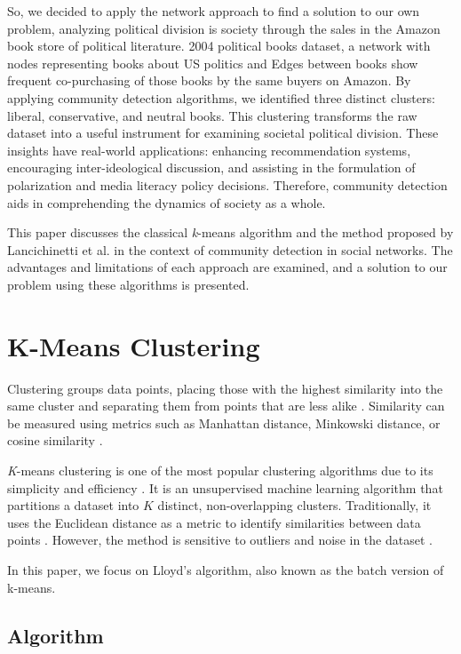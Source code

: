 \documentclass[conference]{IEEEtran}
\begin{document}
So, we decided to apply the network approach to find a solution to our own problem, analyzing political division is society through the sales in the Amazon book store of political literature. 2004 political books dataset\cite{newman_netdata}, a network with nodes representing books about US politics and Edges between books show frequent co-purchasing of those books by the same buyers on Amazon. By applying community detection algorithms, we identified three distinct clusters: liberal, conservative, and neutral books. This clustering transforms the raw dataset into a useful instrument for examining societal political division. These insights have real-world applications: enhancing recommendation systems, encouraging inter-ideological discussion, and assisting in the formulation of polarization and media literacy policy decisions. Therefore, community detection aids in comprehending the dynamics of society as a whole.

This paper discusses the classical \textit{k}-means algorithm and the method proposed by Lancichinetti et al. \cite{lancichinetti2009detecting} in the context of community detection in social networks. The advantages and limitations of each approach are examined, and a solution to our problem using these algorithms is presented.

\section{K-Means Clustering}

Clustering groups data points, placing those with the highest similarity into the same cluster and separating them from points that are less alike \cite{anderberg1973cluster}. Similarity can be measured using metrics such as Manhattan distance, Minkowski distance, or cosine similarity \cite{irani2016clustering}.

\textit{K}-means clustering is one of the most popular clustering algorithms due to its simplicity and efficiency \cite{slonim2013hartigan}. It is an unsupervised machine learning algorithm that partitions a dataset into $K$ distinct, non-overlapping clusters. Traditionally, it uses the Euclidean distance as a metric to identify similarities between data points \cite{irani2016clustering}. However, the method is sensitive to outliers and noise in the dataset \cite{yu2018two}.

In this paper, we focus on Lloyd's algorithm, also known as the batch version of k-means.

\subsection*{Algorithm}
\end{document}
